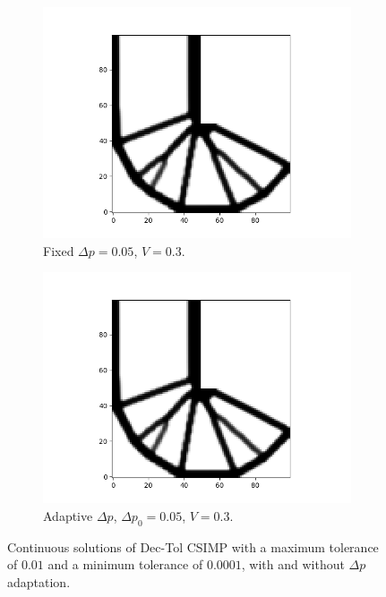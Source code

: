 \begin{figure}
    \begin{subfigure}{0.45\textwidth}
      \includegraphics[width=1\textwidth]{images/adaptive_csimp/lbeam_dec_tol_csimp_03_0001_80_false_001_ip.png}
      \caption{Fixed $\Delta p = 0.05$, $V = 0.3$.}
    \end{subfigure} \hfill
    \begin{subfigure}{0.45\textwidth}
      \includegraphics[width=1\textwidth]{images/adaptive_csimp/lbeam_dec_tol_csimp_03_0001_80_true_001_ip.png}
      \caption{Adaptive $\Delta p$, $\Delta p_0 = 0.05$, $V = 0.3$.}
    \end{subfigure}

    \caption{Continuous solutions of Dec-Tol CSIMP with a maximum tolerance of $0.01$ and a minimum tolerance of $0.0001$, with and without $\Delta p$ adaptation.}
    \label{fig:dec_tol_tops}
  \end{figure}

